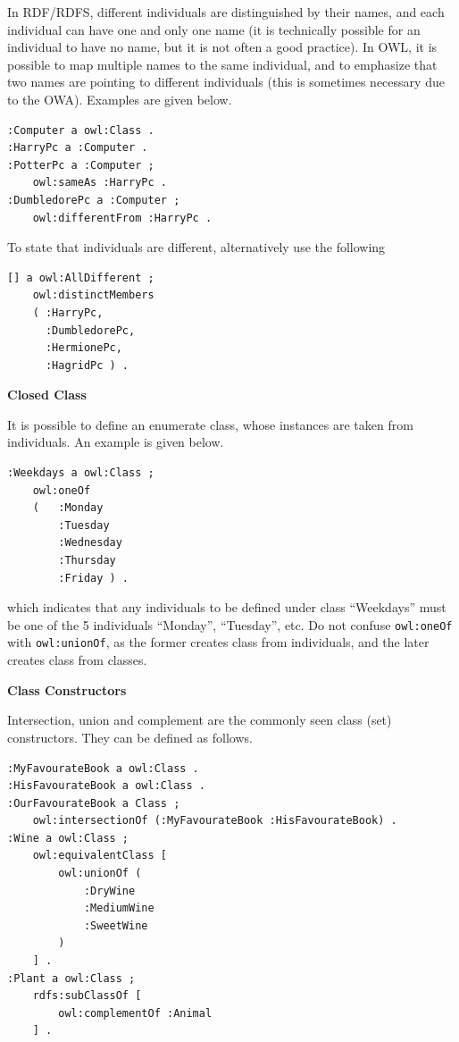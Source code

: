 In RDF/RDFS, different individuals are distinguished by their names, and each individual can have one and only one name (it is technically possible for an individual to have no name, but it is not often a good practice). In OWL, it is possible to map multiple names to the same individual, and to emphasize that two names are pointing to different individuals (this is sometimes necessary due to the OWA). Examples are given below.
\begin{lstlisting}
:Computer a owl:Class .
:HarryPc a :Computer .
:PotterPc a :Computer ;
	owl:sameAs :HarryPc .
:DumbledorePc a :Computer ;
	owl:differentFrom :HarryPc .
\end{lstlisting}
To state that individuals are different, alternatively use the following
\begin{lstlisting}
[] a owl:AllDifferent ;
	owl:distinctMembers
	( :HarryPc,
	  :DumbledorePc,
	  :HermionePc,
	  :HagridPc	) .
\end{lstlisting}

\vspace{0.1in}
\noindent \textbf{Closed Class}
\vspace{0.1in}

It is possible to define an enumerate class, whose instances are taken from individuals. An example is given below.
\begin{lstlisting}
:Weekdays a owl:Class ;
	owl:oneOf
	(	:Monday
		:Tuesday
		:Wednesday
		:Thursday
		:Friday ) .
\end{lstlisting}
which indicates that any individuals to be defined under class ``Weekdays'' must be one of the 5 individuals ``Monday'', ``Tuesday'', etc. Do not confuse \verb|owl:oneOf| with \verb|owl:unionOf|, as the former creates class from individuals, and the later creates class from classes.

\vspace{0.1in}
\noindent \textbf{Class Constructors}
\vspace{0.1in}

Intersection, union and complement are the commonly seen class (set) constructors. They can be defined as follows.
\begin{lstlisting}
:MyFavourateBook a owl:Class .
:HisFavourateBook a owl:Class .
:OurFavourateBook a Class ;
	owl:intersectionOf (:MyFavourateBook :HisFavourateBook) .
:Wine a owl:Class ;
	owl:equivalentClass [
		owl:unionOf (
			:DryWine
			:MediumWine
			:SweetWine
		)
	] .
:Plant a owl:Class ;
	rdfs:subClassOf [
		owl:complementOf :Animal
	] .
\end{lstlisting}

